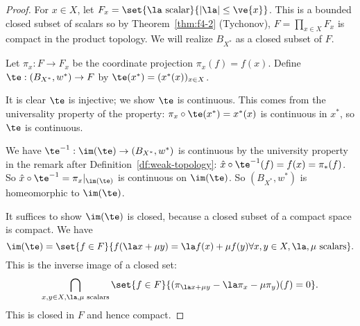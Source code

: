 \begin{proof}
For $x\in X$, let $F_x=\set{\la\text{ scalar}}{|\la|\le \ve{x}}$. This is a bounded closed subset of scalars so by Theorem~\ref{thm:f4-2} (Tychonov), $F=\prod_{x\in X} F_x$ is compact in the product topology. 
We will realize $B_{X^*}$ as a closed subset of $F$.

Let $\pi_x:F\to F_x$ be the coordinate projection $\pi_x(f)=f(x)$. Define $\te:(B_{X^*}, w^*)\to F$ by $\te(x^*)=(x^*(x))_{x\in X}$.

It is clear $\te$ is injective; we show $\te$ is continuous. This comes from the universality property of the property: $\pi_x\circ \te(x^*)=x^*(x)$ is continuous in $x^*$, so $\te$ is continuous.%

We have $\te^{-1}:\im(\te)\to (B_{X^*}, w^*)$ is continuous by the university property in the remark after Definition~\ref{df:weak-topology}: $\hat x\circ \te^{-1}(f)=f(x)=\pi_*(f)$. So $\hat x\circ \te^{-1} =\pi_x|_{\im(\te)}$ is continuous on $\im(\te)$. So $(B_{X^*}, w^*)$ is homeomorphic to $\im(\te)$.

It suffices to show $\im(\te)$ is closed, because a closed subset of a compact space is compact. We have 
\[\im(\te)=\set{f\in F}{f(\la x+\mu y)=\la f(x)+\mu f(y) \forall x,y\in X,\la,\mu\text{ scalars}}.\]
This is the inverse image of a closed set:
\[
\bigcap_{x,y\in X, \la,\mu\text{ scalars}} \set{f\in F}{(\pi_{\la x+\mu y}-\la \pi_x-\mu \pi_y)(f)=0}.
\]
This is closed in $F$ and hence compact.
\end{proof}

